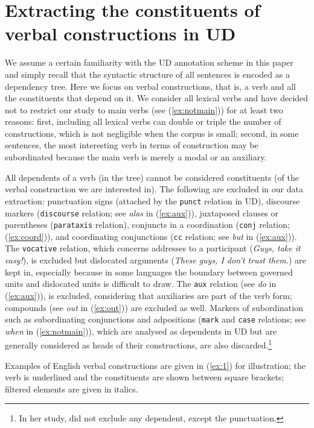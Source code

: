 
\section{Extracting the constituents of verbal constructions in UD}\label{UD}

We assume a certain familiarity with the UD annotation scheme in this paper and simply recall that the syntactic structure of all sentences is encoded as a dependency tree. Here we focus on verbal constructions, that is, a verb and all the constituents that depend on it. We consider all lexical verbs and have decided not to restrict our study to main verbs (see (\ref{ex:notmain})) for at least two reasons: first, including all lexical verbs can double or triple the number of constructions, which is not negligible when the corpus is small; second, in some sentences, the most interesting verb in terms of construction may be subordinated because the main verb is merely a modal or an auxiliary.

All dependents of a verb (in the tree) cannot be considered constituents (of the verbal construction we are interested in). The following are excluded in our data extraction: punctuation signs (attached by the \texttt{punct} relation in UD), discourse markers (\texttt{discourse} relation; see \textit{alas} in (\ref{ex:aux})), juxtaposed clauses or parentheses (\texttt{parataxis} relation), conjuncts in a coordination (\texttt{conj} relation; (\ref{ex:coord})), and coordinating conjunctions (\texttt{cc} relation; see \textit{but} in (\ref{ex:aux})). The \texttt{vocative} relation, which concerns addresses to a participant (\textit{Guys, take it easy!}), is excluded but dislocated arguments (\textit{These guys, I don't trust them.}) are kept in, especially because in some languages the boundary between governed units and dislocated units is difficult to draw. The \texttt{aux} relation (see \textit{do} in (\ref{ex:aux})), is excluded, considering that auxiliaries are part of the verb form; compounds (see \textit{out} in (\ref{ex:out})) are excluded as well. Markers of subordination such as subordinating conjunctions and adpositions (\texttt{mark} and \texttt{case} relations; see \textit{when} in (\ref{ex:notmain})), which are analysed as dependents in UD but are generally considered as heads of their constructions, are also discarded.\footnote{In her study, \citet{tanaka2021menzerath} did not exclude any dependent, except the punctuation.}

Examples of English verbal constructions are given in (\ref{ex:1}) for illustration; the verb is underlined and the constituents are shown between square brackets; filtered elements are given in italics.

